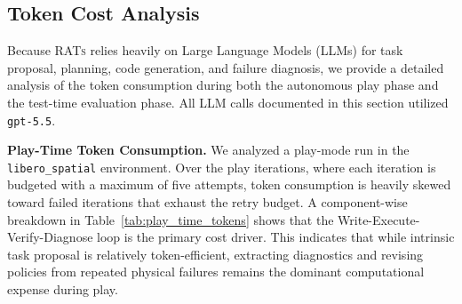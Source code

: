 \begin{table}[t]
    \centering
    \setlength{\tabcolsep}{3.5pt}
    \caption{\textbf{MolmoSpaces ablation over play strategy and test-time system.} All
    play-based variants use 50 play iterations. All play-time skills are learned by our proposed \textsc{RATs} system.}
    \label{tab:molmospaces-ablation}
\end{table}


\subsection{Token Cost Analysis}
\label{sec:token_cost_analysis}

Because \textsc{RATs} relies heavily on Large Language Models (LLMs) for task proposal, planning,
code generation, and failure diagnosis, we provide a detailed analysis of the token consumption
during both the autonomous play phase and the test-time evaluation phase. All LLM calls documented
in this section utilized \texttt{gpt-5.5}.

\textbf{Play-Time Token Consumption.} We analyzed a play-mode run in the
\texttt{libero\_spatial} environment. Over the play iterations, where each iteration is budgeted with
a maximum of five attempts, token consumption is heavily skewed toward failed iterations that
exhaust the retry budget. A component-wise breakdown in Table~\ref{tab:play_time_tokens} shows
that the Write-Execute-Verify-Diagnose loop is the primary cost driver. This indicates that while
intrinsic task proposal is relatively token-efficient, extracting diagnostics and revising policies from
repeated physical failures remains the dominant computational expense during play.

